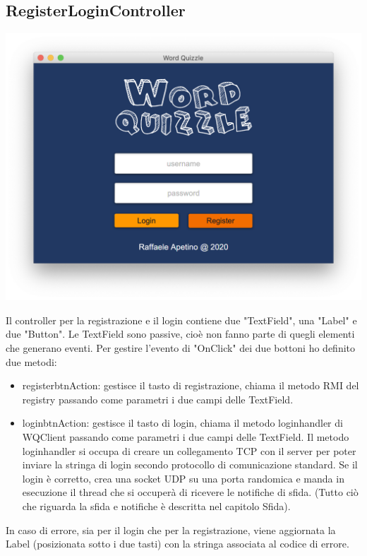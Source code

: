\documentclass{article}
\begin{document}
\subsection{RegisterLoginController}
\begin{center}
\includegraphics[scale=0.5]{quizzleloginregister.png}
\end{center}
Il controller per la registrazione e il login contiene due "TextField", una "Label" e due "Button". Le TextField sono passive, cioè non fanno parte di quegli elementi che generano eventi. Per gestire l'evento di "OnClick" dei due bottoni ho definito due metodi:
\begin{itemize}
    \item registerbtnAction: gestisce il tasto di registrazione, chiama il metodo RMI del registry passando come parametri i due campi delle TextField.
    \item loginbtnAction: gestisce il tasto di login, chiama il metodo login\textunderscore handler di WQClient passando come parametri i due campi delle TextField. Il metodo login\textunderscore handler si occupa di creare un collegamento TCP con il server per poter inviare la stringa di login secondo protocollo di comunicazione standard. Se il login è corretto, crea una socket UDP su una porta randomica e manda in esecuzione il thread che si occuperà di ricevere le notifiche di sfida. (Tutto ciò che riguarda la sfida e notifiche è descritta nel capitolo Sfida). 
\end{itemize}
In caso di errore, sia per il login che per la registrazione, viene aggiornata la Label (posizionata sotto i due tasti) con la stringa associata al codice di errore.
\end{document}
